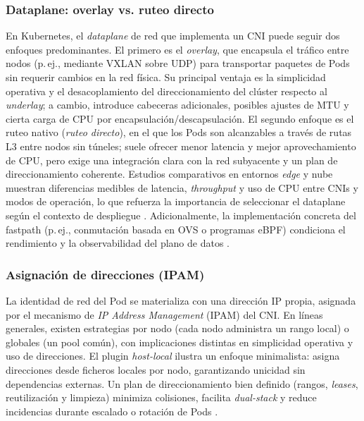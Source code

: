 \documentclass[journal]{IEEEtran}
\begin{document}
\subsubsection{Dataplane: overlay vs. ruteo directo}
En Kubernetes, el \emph{dataplane} de red que implementa un CNI puede seguir dos enfoques predominantes. El primero es el \emph{overlay}, que encapsula el tráfico entre nodos (p.\,ej., mediante VXLAN sobre UDP) para transportar paquetes de Pods sin requerir cambios en la red física. Su principal ventaja es la simplicidad operativa y el desacoplamiento del direccionamiento del clúster respecto al \emph{underlay}; a cambio, introduce cabeceras adicionales, posibles ajustes de MTU y cierta carga de CPU por encapsulación/descapsulación. El segundo enfoque es el ruteo nativo (\emph{ruteo directo}), en el que los Pods son alcanzables a través de rutas L3 entre nodos sin túneles; suele ofrecer menor latencia y mejor aprovechamiento de CPU, pero exige una integración clara con la red subyacente y un plan de direccionamiento coherente. Estudios comparativos en entornos \emph{edge} y nube muestran diferencias medibles de latencia, \emph{throughput} y uso de CPU entre CNIs y modos de operación, lo que refuerza la importancia de seleccionar el dataplane según el contexto de despliegue \cite{ref7,ref8}. Adicionalmente, la implementación concreta del fastpath (p.\,ej., conmutación basada en OVS o programas eBPF) condiciona el rendimiento y la observabilidad del plano de datos \cite{ref11,ref22}.

\subsubsection{Asignación de direcciones (IPAM)}
La identidad de red del Pod se materializa con una dirección IP propia, asignada por el mecanismo de \emph{IP Address Management} (IPAM) del CNI. En líneas generales, existen estrategias por nodo (cada nodo administra un rango local) o globales (un pool común), con implicaciones distintas en simplicidad operativa y uso de direcciones. El plugin \emph{host-local} ilustra un enfoque minimalista: asigna direcciones desde ficheros locales por nodo, garantizando unicidad sin dependencias externas. Un plan de direccionamiento bien definido (rangos, \emph{leases}, reutilización y limpieza) minimiza colisiones, facilita \emph{dual-stack} y reduce incidencias durante escalado o rotación de Pods \cite{ref18,ref20}.
\end{document}

